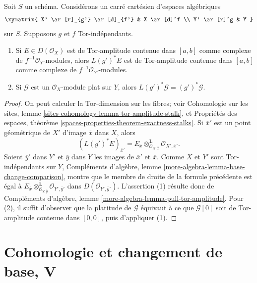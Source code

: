 \begin{lemma}
\label{lemma-tor-independence-and-tor-amplitude}
Soit $S$ un sch\'ema. Consid\'erons un carr\'e cart\'esien d'espaces alg\'ebriques
$$
\xymatrix{
X' \ar[r]_{g'} \ar[d]_{f'} & X \ar[d]^f \\
Y' \ar[r]^g & Y
}
$$
sur $S$. Supposons $g$ et $f$ Tor-ind\'ependants.
\begin{enumerate}
\item Si $E\in D(\mathcal{O}_X)$ est de Tor-amplitude contenue dans $[a,b]$
comme complexe de $f^{-1}\mathcal{O}_Y$-modules, alors $L(g')^*E$ est de
Tor-amplitude contenue dans $[a,b]$ comme complexe de
$f^{-1}\mathcal{O}_{Y'}$-modules.
\item Si $\mathcal{G}$ est un $\mathcal{O}_X$-module plat sur $Y$, alors
$L(g')^*\mathcal{G}=(g')^*\mathcal{G}$.
\end{enumerate}
\end{lemma}

\begin{proof}
On peut calculer la Tor-dimension sur les fibres; voir Cohomologie sur les
sites, lemme \ref{sites-cohomology-lemma-tor-amplitude-stalk}, et Propri\'et\'es
des espaces, th\'eor\`eme \ref{spaces-properties-theorem-exactness-stalks}.
Si $\overline{x}'$ est un point g\'eom\'etrique de $X'$ d'image $\overline x$
dans $X$, alors
$$
(L(g')^*E)_{\overline{x}'} =
E_{\overline{x}}
\otimes_{\mathcal{O}_{X, \overline{x}}}^\mathbf{L}
\mathcal{O}_{X', \overline{x}'}.
$$
Soient $\overline y'$ dans $Y'$ et $\overline y$ dans $Y$ les images de
$\overline x'$ et $\overline x$. Comme $X$ et $Y'$ sont Tor-ind\'ependants sur
$Y$, Compl\'ements d'alg\`ebre, lemme
\ref{more-algebra-lemma-base-change-comparison}, montre que le membre de droite
de la formule pr\'ec\'edente est \'egal \`a
$E_{\overline{x}}
\otimes_{\mathcal{O}_{Y, \overline{y}}}^\mathbf{L}
\mathcal{O}_{Y', \overline{y}'}$
dans $D(\mathcal{O}_{Y',\overline y'})$. L'assertion (1) r\'esulte donc de
Compl\'ements d'alg\`ebre, lemme
\ref{more-algebra-lemma-pull-tor-amplitude}. Pour (2), il suffit d'observer que
la platitude de $\mathcal G$ \'equivaut \`a ce que $\mathcal G[0]$ soit de
Tor-amplitude contenue dans $[0,0]$, puis d'appliquer (1).
\end{proof}

\section{Cohomologie et changement de base, V}
\label{section-cohomology-base-change}

